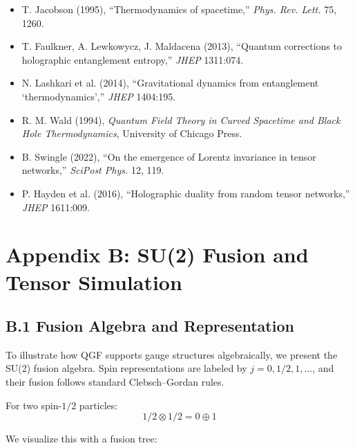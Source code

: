 \documentclass[11pt]{article}
\def\frac#1#2{#1/#2}
\begin{document}
\begin{itemize}
    \item T. Jacobson (1995), “Thermodynamics of spacetime,” \textit{Phys. Rev. Lett.} 75, 1260.
    \item T. Faulkner, A. Lewkowycz, J. Maldacena (2013), “Quantum corrections to holographic entanglement entropy,” \textit{JHEP} 1311:074.
    \item N. Lashkari et al. (2014), “Gravitational dynamics from entanglement ‘thermodynamics’,” \textit{JHEP} 1404:195.
    \item R. M. Wald (1994), \textit{Quantum Field Theory in Curved Spacetime and Black Hole Thermodynamics}, University of Chicago Press.
    \item B. Swingle (2022), “On the emergence of Lorentz invariance in tensor networks,” \textit{SciPost Phys.} 12, 119.
    \item P. Hayden et al. (2016), “Holographic duality from random tensor networks,” \textit{JHEP} 1611:009.
\end{itemize}


\section*{Appendix B: SU(2) Fusion and Tensor Simulation}

\subsection*{B.1 Fusion Algebra and Representation}

To illustrate how QGF supports gauge structures algebraically, we present the SU(2) fusion algebra. Spin representations are labeled by $j = 0, \frac{1}{2}, 1, \ldots$, and their fusion follows standard Clebsch--Gordan rules.

For two spin-$\frac{1}{2}$ particles:
\[
\frac{1}{2} \otimes \frac{1}{2} = 0 \oplus 1
\]

We visualize this with a fusion tree:

\begin{center}
\end{center}
\end{document}
